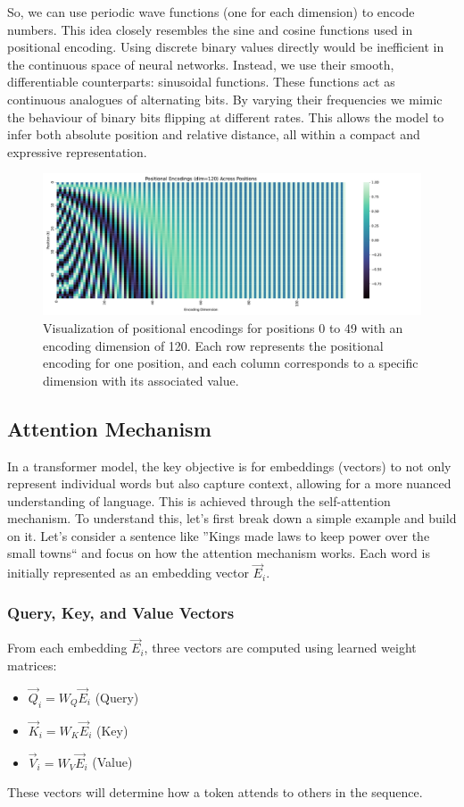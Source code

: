 \vspace{-0.3cm}
So, we can use periodic wave functions (one for each dimension) to encode numbers. This idea closely resembles the sine and 
cosine functions used in positional encoding. Using discrete binary values directly would be inefficient in the continuous 
space of neural networks. Instead, we use their smooth, differentiable counterparts: sinusoidal functions. These functions act 
as continuous analogues of alternating bits. By varying their frequencies we mimic the behaviour of binary bits flipping at 
different rates. This allows the model to infer both absolute position and relative distance, all within a compact and expressive 
representation.
\begin{figure}[H]
\hspace{1.5cm}
    \includegraphics[width=0.92\linewidth]{images/pos_enc_visual.pdf}
   \caption{Visualization of positional encodings for positions 0 to 49 with an encoding dimension of 120. Each row represents 
   the positional encoding for one position, and each column corresponds to a specific dimension with its associated value.}
    \label{fig:pos_enc_vis}
\end{figure}
\subsection{Attention Mechanism}
In a transformer model, the key objective is for embeddings (vectors) to not only represent individual words 
but also capture context, allowing for a more nuanced understanding of language. This is achieved through 
the self-attention mechanism. To understand this, let's first break down a simple example and build on it.
Let's consider a sentence like ''Kings made laws to keep power over the small towns`` and focus on how the 
attention mechanism works. Each word is initially represented as an embedding vector $\vec{E}_i$.

\subsubsection{Query, Key, and Value Vectors}
From each embedding $\vec{E}_i$, three vectors are computed using learned weight matrices: 
\begin{itemize} 
\item $\vec{Q}_i = W_Q \vec{E}_i$ (Query) 
\item $\vec{K}_i = W_K \vec{E}_i$ (Key) 
\item $\vec{V}_i = W_V \vec{E}_i$ (Value) 
\end{itemize}
These vectors will determine how a token attends to others in the sequence.

